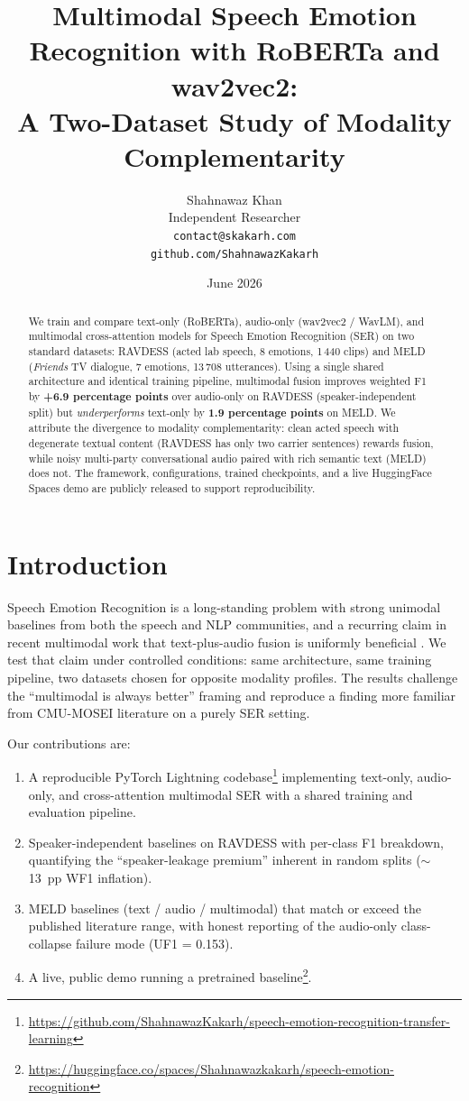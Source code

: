 \documentclass[a4paper,10pt]{article}
\title{Multimodal Speech Emotion Recognition with RoBERTa and wav2vec2:\\
       A Two-Dataset Study of Modality Complementarity}
\author{Shahnawaz Khan\\
        Independent Researcher\\
        \texttt{contact@skakarh.com}\\
        \texttt{github.com/ShahnawazKakarh}}
\date{June 2026}
\begin{document}
\maketitle

\begin{abstract}
We train and compare text-only (RoBERTa), audio-only (wav2vec2 / WavLM), and
multimodal cross-attention models for Speech Emotion Recognition (SER) on
two standard datasets: RAVDESS (acted lab speech, 8 emotions, 1\,440 clips)
and MELD (\emph{Friends} TV dialogue, 7 emotions, 13\,708 utterances). Using
a single shared architecture and identical training pipeline, multimodal
fusion improves weighted F1 by \textbf{+6.9 percentage points} over
audio-only on RAVDESS (speaker-independent split) but \emph{underperforms}
text-only by \textbf{1.9 percentage points} on MELD. We attribute the
divergence to modality complementarity: clean acted speech with degenerate
textual content (RAVDESS has only two carrier sentences) rewards fusion,
while noisy multi-party conversational audio paired with rich semantic text
(MELD) does not. The framework, configurations, trained checkpoints, and a
live HuggingFace Spaces demo are publicly released to support reproducibility.
\end{abstract}

\section{Introduction}

Speech Emotion Recognition is a long-standing problem with strong unimodal
baselines from both the speech and NLP communities, and a recurring claim
in recent multimodal work that text-plus-audio fusion is uniformly
beneficial \cite{poria2017,zadeh2018,hazarika2020}. We test that claim
under controlled conditions: same architecture, same training pipeline, two
datasets chosen for opposite modality profiles. The results challenge the
``multimodal is always better'' framing and reproduce a finding more
familiar from CMU-MOSEI literature \cite{zadeh2018,hazarika2020} on a
purely SER setting.

Our contributions are:
\begin{enumerate}
\item A reproducible PyTorch Lightning codebase\footnote{%
\url{https://github.com/ShahnawazKakarh/speech-emotion-recognition-transfer-learning}}
implementing text-only, audio-only, and cross-attention multimodal SER
with a shared training and evaluation pipeline.
\item Speaker-independent baselines on RAVDESS with per-class F1
breakdown, quantifying the ``speaker-leakage premium'' inherent in random
splits ($\sim$13~pp WF1 inflation).
\item MELD baselines (text / audio / multimodal) that match or exceed the
published literature range, with honest reporting of the audio-only
class-collapse failure mode (UF1 = 0.153).
\item A live, public demo running a pretrained baseline\footnote{%
\url{https://huggingface.co/spaces/Shahnawazkakarh/speech-emotion-recognition}}.
\end{enumerate}
\end{document}
